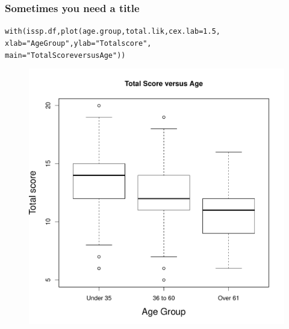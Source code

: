 \documentclass{beamer}\usepackage[]{graphicx}\usepackage[]{color}
\makeatletter
\newcommand{\hlnum}[1]{\textcolor[rgb]{0.533,0,0.133}{#1}}%
\newcommand{\hlstr}[1]{\textcolor[rgb]{0.667,0.267,0}{#1}}%
\newcommand{\hlstd}[1]{\textcolor[rgb]{0,0,0}{#1}}%
\newcommand{\hlkwc}[1]{\textcolor[rgb]{0,0,0.4}{#1}}%
\newcommand{\hlkwd}[1]{\textcolor[rgb]{0,0.267,0.4}{#1}}%
\newenvironment{kframe}{%
 \def\at@end@of@kframe{}%
 \ifinner\ifhmode%
  \def\at@end@of@kframe{\end{minipage}}%
  \begin{minipage}{\columnwidth}%
 \fi\fi%
 \def\FrameCommand##1{\hskip\@totalleftmargin \hskip-\fboxsep
 \colorbox{shadecolor}{##1}\hskip-\fboxsep
     \hskip-\linewidth \hskip-\@totalleftmargin \hskip\columnwidth}%
 \MakeFramed {\advance\hsize-\width
   \@totalleftmargin\z@ \linewidth\hsize
   \@setminipage}}%
 {\par\unskip\endMakeFramed%
 \at@end@of@kframe}
\newenvironment{knitrout}{}{} %
\makeatother
\begin{document}
\begin{frame}[fragile]
  \frametitle{Sometimes you need a title}
\begin{knitrout}
\color{fgcolor}\begin{kframe}
\begin{alltt}
\hlkwd{with}\hlstd{(issp.df,} \hlkwd{plot}\hlstd{(age.group, total.lik,} \hlkwc{cex.lab} \hlstd{=} \hlnum{1.5}\hlstd{,}
   \hlkwc{xlab} \hlstd{=} \hlstr{"Age Group"}\hlstd{,} \hlkwc{ylab} \hlstd{=} \hlstr{"Total score"}\hlstd{,}
    \hlkwc{main} \hlstd{=} \hlstr{"Total Score versus Age"}\hlstd{))}
\end{alltt}
\end{kframe}
\end{knitrout}

\begin{figure}[h]
  \vspace{-20pt}
\centering
  \includegraphics[height = 0.55\textwidth, keepaspectratio]{Figure/box5}
 \label{fig:box5}
\end{figure}
\end{frame}
\end{document}
